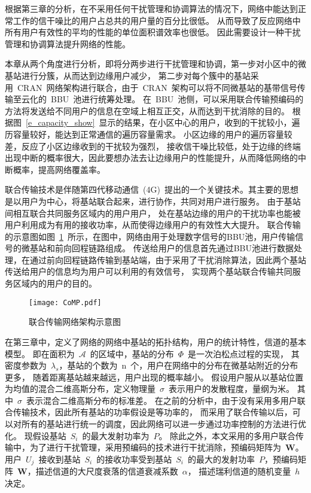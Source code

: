 

根据第三章的分析，在不采用任何干扰管理和协调算法的情况下，网络中能达到正常工作的信干噪比的用户占总共的用户量的百分比很低。
从而导致了反应网络中所有用户有效性的平均的性能的单位面积谱效率也很低。
因此需要设计一种干扰管理和协调算法提升网络的性能。

本章从两个角度进行分析，即将分两步进行干扰管理和协调，第一步对小区中的微基站进行分簇，从而达到边缘用户减少，
第二步对每个簇中的基站采用~CRAN~网络架构进行联合，由于~CRAN~架构可以将不同微基站的基带信号传输至云化的~BBU~池进行统筹处理。
在~BBU~池侧，可以采用联合传输预编码的方法将发送给不同用户的信息在空域上相互正交，从而达到干扰消除的目的。
根据图~\ref{e_capacity_show}~显示的结果，在小区中心的用户，收到的干扰较小，遍历容量较好，能达到正常通信的遍历容量需求。
小区边缘的用户的遍历容量较差，反应了小区边缘收到的干扰较为强烈，
接收信干噪比较低，处于边缘的终端出现中断的概率很大，因此要想办法去让边缘用户的性能提升，从而降低网络的中断概率，提高网络覆盖率。

联合传输技术是伴随第四代移动通信~(4G)~提出的一个关键技术。其主要的思想是以用户为中心，将基站联合起来，进行协作，共同对用户进行服务。
由于基站间相互联合共同服务区域内的用户用户，
处在基站边缘的用户的干扰功率也能被用户利用成为有用的接收功率，从而使得边缘用户的有效性大大提升。
联合传输的示意图如图~\ref{CoMP}~所示，在图中，网络由用于处理数字信号的BBU池，用户传输信号的微基站和前向回程链路组成。
传送给用户的信息首先通过BBU池进行数据处理，在通过前向回程链路传输到基站端，由于采用了干扰消除算法，因此两个基站传送给用户的信息均为用户可以利用的有效信号，
实现两个基站联合传输共同服务区域内的用户的目的。
\begin{figure}[htbp]
\centering
\texttt{[image: CoMP.pdf]}
\caption{联合传输网络架构示意图}\vspace{-0.5em}
\label{CoMP}
\end{figure}

在第三章中，定义了网络的网络中基站的拓扑结构，用户的统计特性，信道的基本模型。
即在面积为~$\mathcal{A}$~的区域中，基站的分布~$\Phi$~是一次泊松点过程的实现，
其密度参数为~$\lambda_s$，基站的个数为~n~个，用户在网络中的分布在微基站附近的分布更多，
随着距离基站越来越远，用户出现的概率越小。
假设用户服从以基站位置为均值的混合二维高斯分布，定义物理量~$\sigma$~表示用户的发散程度，量纲为米。
其中~$\sigma$~表示混合二维高斯分布的标准差。
在之前的分析中，由于没有采用多用户联合传输技术，因此所有基站的功率假设是等功率的，
而采用了联合传输以后，可以对所有的基站进行统一的调度，因此网络可以进一步通过功率控制的方法进行优化。
现假设基站~$S_i$~的最大发射功率为~$P$。
除此之外，本文采用的多用户联合传输中，为了进行干扰管理，采用预编码的技术进行干扰消除，预编码矩阵为~$\mathbf{W}$。
用户~$U_j$~接收到基站~$S_i$~的接收功率受到基站~$S_i$~的最大的发射功率~$P$，预编码矩阵~$\mathbf{W}$，描述信道的大尺度衰落的信道衰减系数~$\alpha$，
描述瑞利信道的随机变量~$h$决定。

